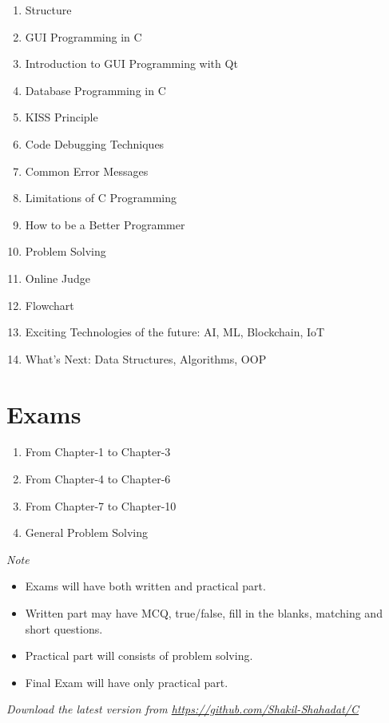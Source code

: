 \documentclass[a4paper,11pt]{article}
\begin{document}
	\begin{enumerate}
		\item Structure
		\item GUI Programming in C
		\item Introduction to GUI Programming with Qt
		\item Database Programming in C
		\item KISS Principle
		\item Code Debugging Techniques
		\item Common Error Messages
		\item Limitations of C Programming
		\item How to be a Better Programmer
		\item Problem Solving
		\item Online Judge
		\item Flowchart
		\item Exciting Technologies of the future: AI, ML, Blockchain, IoT
		\item What’s Next: Data Structures, Algorithms, OOP
	\end{enumerate}


	\section*{ Exams }

	\begin{enumerate}
		\item From Chapter-1 to Chapter-3
		\item From Chapter-4 to Chapter-6
		\item From Chapter-7 to Chapter-10
		\item General Problem Solving
	\end{enumerate}


	\em Note

	\begin{itemize}
		\item Exams will have both written and practical part.
		\item Written part may have MCQ, true/false, fill in the blanks, matching and short questions.
		\item Practical part will consists of problem solving.
		\item Final Exam will have only practical part.
	\end{itemize}

	\vspace*{\fill}
	\em \large Download the latest version from \url{https://github.com/Shakil-Shahadat/C}
\end{document}
